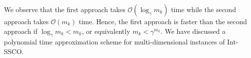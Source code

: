 We observe that the first approach takes $\mathcal{O}(\log_{\gamma} m_k)$ time while the second approach takes $\mathcal{O}(m_k)$ time. Hence, the first approach is faster than the second approach if $\log_{\gamma} m_k < m_k$, or equivalently $m_k < \gamma^{m_k}$. We have discussed a polynomial time approximation scheme for multi-dimensional instances of Int-SSCO.

